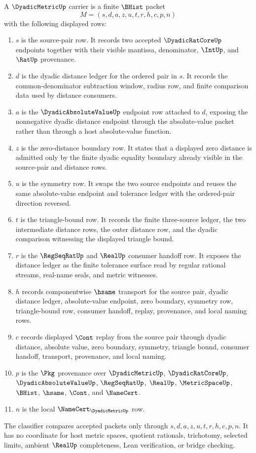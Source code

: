 \begin{definition}
\label{def:dyadic-metric-carrier}
A $\DyadicMetricUp$ carrier is a finite $\BHist$ packet
$$
M=(s,d,a,z,u,t,r,h,c,p,n)
$$
with the following displayed rows:
\begin{enumerate}
\item $s$ is the source-pair row. It records two accepted $\DyadicRatCoreUp$ endpoints together with their visible mantissa, denominator, $\IntUp$, and $\RatUp$ provenance.
\item $d$ is the dyadic distance ledger for the ordered pair in $s$. It records the common-denominator subtraction window, radius row, and finite comparison data used by distance consumers.
\item $a$ is the $\DyadicAbsoluteValueUp$ endpoint row attached to $d$, exposing the nonnegative dyadic distance endpoint through the absolute-value packet rather than through a host absolute-value function.
\item $z$ is the zero-distance boundary row. It states that a displayed zero distance is admitted only by the finite dyadic equality boundary already visible in the source-pair and distance rows.
\item $u$ is the symmetry row. It swaps the two source endpoints and reuses the same absolute-value endpoint and tolerance ledger with the ordered-pair direction reversed.
\item $t$ is the triangle-bound row. It records the finite three-source ledger, the two intermediate distance rows, the outer distance row, and the dyadic comparison witnessing the displayed triangle bound.
\item $r$ is the $\RegSeqRatUp$ and $\RealUp$ consumer handoff row. It exposes the distance ledger as the finite tolerance surface read by regular rational streams, real-name seals, and metric witnesses.
\item $h$ records componentwise $\hsame$ transport for the source pair, dyadic distance ledger, absolute-value endpoint, zero boundary, symmetry row, triangle-bound row, consumer handoff, replay, provenance, and local naming rows.
\item $c$ records displayed $\Cont$ replay from the source pair through dyadic distance, absolute value, zero boundary, symmetry, triangle bound, consumer handoff, transport, provenance, and local naming.
\item $p$ is the $\Pkg$ provenance over $\DyadicMetricUp$, $\DyadicRatCoreUp$, $\DyadicAbsoluteValueUp$, $\RegSeqRatUp$, $\RealUp$, $\MetricSpaceUp$, $\BHist$, $\hsame$, $\Cont$, and $\NameCert$.
\item $n$ is the local $\NameCert_{\DyadicMetricUp}$ row.
\end{enumerate}
The classifier compares accepted packets only through $s,d,a,z,u,t,r,h,c,p,n$. It has no coordinate for host metric spaces, quotient rationals, trichotomy, selected limits, ambient $\RealUp$ completeness, Lean verification, or bridge checking.
\end{definition}

